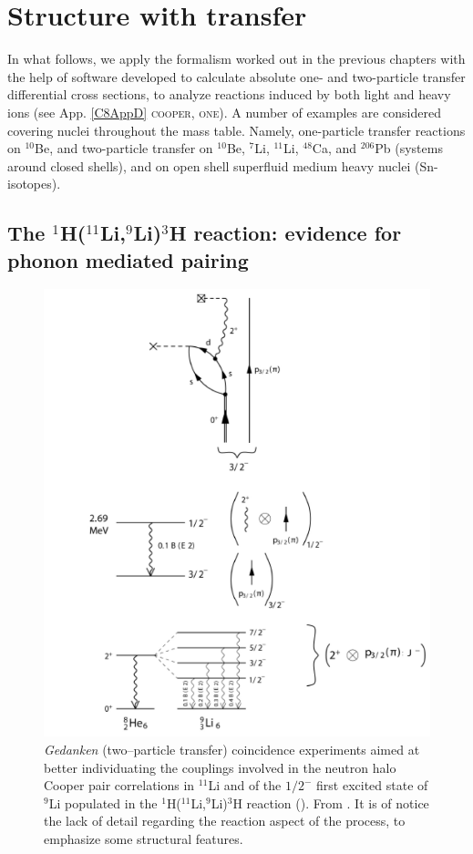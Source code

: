  \chapter[Structure with two neutrons]{Structure with transfer}\label{C8}
 In what follows, we apply the formalism worked out in the previous chapters with the help of software developed to calculate absolute one- and two-particle transfer differential cross sections, to analyze reactions induced by both light and heavy ions (see App. \ref{C8AppD} \textsc{cooper}, \textsc{one}).
 A number of examples are considered covering nuclei throughout the mass table. Namely,  one-particle transfer reactions on  $^{10}$Be, and two-particle transfer  on $^{10}$Be,    $^{7}$Li, $^{11}$Li, $^{48}$Ca, and $^{206}$Pb (systems around closed shells), and on open shell superfluid medium heavy nuclei (Sn-isotopes).
 \section[Evidence for phonon mediated pairing]{The $^1$H($^{11}$Li,$^9$Li)$^3$H reaction: evidence for phonon mediated pairing}\label{C8S1}
    \begin{figure}
    \centerline{\includegraphics*[width=16cm,angle=0]{C8/figsC8/fig8_1_3x}}
    	\caption{\emph{Gedanken} (two--particle transfer) coincidence experiments aimed at better individuating the couplings involved in the neutron halo Cooper pair correlations in $^{11}$Li and of the $1/2^-$ first excited state of $^9$Li populated in the  
    	 $^1$H($^{11}$Li,$^9$Li)$^3$H  reaction (\cite{Tanihata:08,Barranco:01,Potel:10}). From \cite{Potel:14}. It is of notice the lack of detail regarding the reaction aspect of the process, to emphasize some structural features.}\label{fig8_1_3}
    \end{figure}
